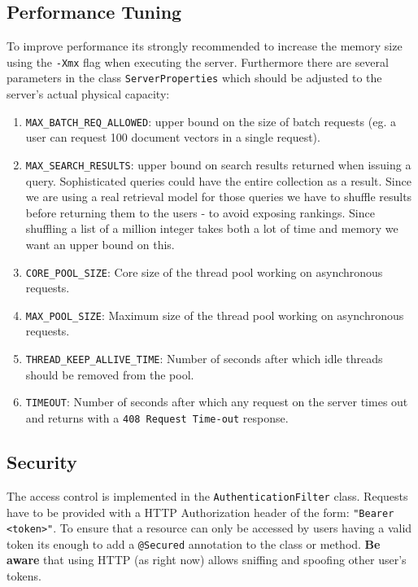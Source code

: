 \documentclass[a4paper,11pt]{article}
\begin{document}
\subsection{Performance Tuning}
\label{ch:performance}
To improve performance its strongly recommended to increase the memory size using the \texttt{-Xmx} flag when executing the server. Furthermore there are several parameters in the class \texttt{ServerProperties} which should be adjusted to the server's actual physical capacity: 
\begin{enumerate}
\item \texttt{MAX\_BATCH\_REQ\_ALLOWED}: upper bound on the size of batch requests (eg. a user can request 100 document vectors in a single request). 
\item \texttt{MAX\_SEARCH\_RESULTS}: upper bound on search results returned when issuing a query. Sophisticated queries could have the entire collection as a result. Since we are using a real retrieval model for those queries we have to shuffle results before returning them to the users - to avoid exposing rankings. Since shuffling a list of a million integer takes both a lot of time and memory we want an upper bound on this.
\item \texttt{CORE\_POOL\_SIZE}: Core size of the thread pool working on asynchronous requests.
\item \texttt{MAX\_POOL\_SIZE}: Maximum size of the thread pool working on asynchronous requests.
\item \texttt{THREAD\_KEEP\_ALLIVE\_TIME}: Number of seconds after which idle threads should be removed from the pool. 
\item \texttt{TIMEOUT}: Number of seconds after which any request on the server times out and returns with a \texttt{408 Request Time-out} response.
\end{enumerate}

\subsection{Security}
The access control is implemented in the \texttt{AuthenticationFilter} class. Requests have to be provided with a HTTP Authorization header of the form: \texttt{"Bearer <token>"}. To ensure that a  resource can only be accessed by users having a valid token its enough to add a \texttt{@Secured} annotation to the class or method. \textbf{Be aware} that using HTTP (as right now) allows sniffing and spoofing other user's tokens.
\end{document}
